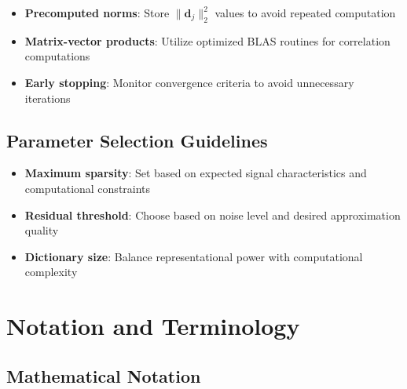 \documentclass[12pt]{article}
\begin{document}
\begin{itemize}
    \item \textbf{Precomputed norms}: Store $\|\mathbf{d}_j\|_2^2$ values to avoid repeated computation
    \item \textbf{Matrix-vector products}: Utilize optimized BLAS routines for correlation computations
    \item \textbf{Early stopping}: Monitor convergence criteria to avoid unnecessary iterations
\end{itemize}

\subsection{Parameter Selection Guidelines}

\begin{itemize}
    \item \textbf{Maximum sparsity}: Set based on expected signal characteristics and computational constraints
    \item \textbf{Residual threshold}: Choose based on noise level and desired approximation quality
    \item \textbf{Dictionary size}: Balance representational power with computational complexity
\end{itemize}

\newpage

\section{Notation and Terminology}

\subsection{Mathematical Notation}
\end{document}
